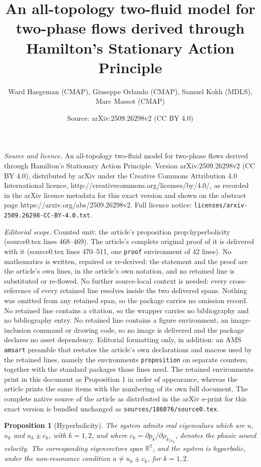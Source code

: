 \documentclass[10pt,a4paper]{amsart}
\title{An all-topology two-fluid model for two-phase flows derived through Hamilton's Stationary Action Principle}
\author{Ward Haegeman (CMAP), Giuseppe Orlando (CMAP), Samuel Kokh (MDLS), Marc Massot (CMAP)}
\date{Source: arXiv:2509.26298v2 (CC BY 4.0)}
\newtheorem{proposition}{Proposition}
\begin{document}
\maketitle

\noindent\emph{Source and licence.} An all-topology two-fluid model for two-phase flows derived through Hamilton's Stationary Action Principle. Version arXiv:2509.26298v2 (CC BY 4.0), distributed by arXiv under the Creative Commons Attribution 4.0 International licence, http://creativecommons.org/licenses/by/4.0/, as recorded in the arXiv licence metadata for this exact version and shown on the abstract page https://arxiv.org/abs/2509.26298v2. Full licence notice: \texttt{licenses/arxiv-2509.26298-CC-BY-4.0.txt}.\par\smallskip

\noindent\textit{Editorial scope.} Counted unit: the article's proposition prop:hyperbolicity (source0.tex lines 468--469). The article's complete original proof of it is delivered with it (source0.tex lines 470--511, one \texttt{proof} environment of 42 lines). No mathematics is written, repaired or re-derived: the statement and the proof are the article's own lines, in the article's own notation, and no retained line is substituted or re-flowed.  No further source-local context is needed: every cross-reference of every retained line resolves inside the two delivered spans.  Nothing was omitted from any retained span, so the package carries no omission record.  No retained line contains a citation, so the wrapper carries no bibliography and no bibliography entry.  No retained line contains a figure environment, an image-inclusion command or drawing code, so no image is delivered and the package declares no asset dependency.  Editorial formatting only, in addition: an AMS \texttt{amsart} preamble that restates the article's own declarations and macros used by the retained lines, namely the environments \texttt{proposition} on separate counters, together with the standard packages those lines need.  The retained environments print in this document as Proposition 1 in order of appearance, whereas the article prints the same items with the numbering of its own full document.  The complete native source of the article as distributed in the arXiv e-print for this exact version is bundled unchanged as \texttt{sources/186076/source0.tex}.
\begin{proposition}[Hyperbolicity]\label{prop:hyperbolicity} The system admits real eigenvalues which are $u$, $u_k$ and $u_k\pm c_k$, with $k=1,2$, and where $c_k=\partial p_k/\partial{\rho_k}_{|s_k}$, denotes the phasic sound velocity. The corresponding eigenvectors span $\mathbb{R}^7$, and the system is hyperbolic, under the non-resonance condition $u\neq u_k\pm c_k$, for $k=1,2$.
\end{proposition}
\end{document}
